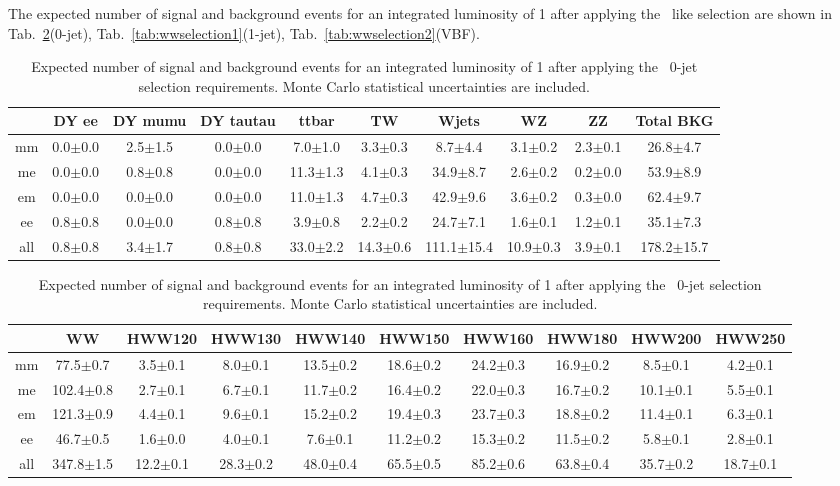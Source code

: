The expected number of signal and background events for an integrated 
luminosity of 1\ifb{} after applying the 
\WW\ like selection are shown in Tab.~\ref{tab:wwselection0}(0-jet), Tab.~\ref{tab:wwselection1}(1-jet), Tab.~\ref{tab:wwselection2}(VBF).

\begin{table}[!ht]
  \begin{center}
 {\small
  \begin{tabular} {|c|c|c|c|c|c|c|c|c|c|}
\hline
  & DY ee & DY mumu & DY tautau & ttbar & TW & Wjets & WZ & ZZ & Total BKG \\
  \hline
  \hline
  mm &  0.0$\pm$0.0 &  2.5$\pm$1.5 &  0.0$\pm$0.0 &  7.0$\pm$1.0 &  3.3$\pm$0.3 &   8.7$\pm$4.4 &  3.1$\pm$0.2 &  2.3$\pm$0.1 &  26.8$\pm$4.7 \\
  me &  0.0$\pm$0.0 &  0.8$\pm$0.8 &  0.0$\pm$0.0 & 11.3$\pm$1.3 &  4.1$\pm$0.3 &  34.9$\pm$8.7 &  2.6$\pm$0.2 &  0.2$\pm$0.0 &  53.9$\pm$8.9 \\
  em &  0.0$\pm$0.0 &  0.0$\pm$0.0 &  0.0$\pm$0.0 & 11.0$\pm$1.3 &  4.7$\pm$0.3 &  42.9$\pm$9.6 &  3.6$\pm$0.2 &  0.3$\pm$0.0 &  62.4$\pm$9.7 \\
  ee &  0.8$\pm$0.8 &  0.0$\pm$0.0 &  0.8$\pm$0.8 &  3.9$\pm$0.8 &  2.2$\pm$0.2 &  24.7$\pm$7.1 &  1.6$\pm$0.1 &  1.2$\pm$0.1 &  35.1$\pm$7.3 \\
 \hline
 all &  0.8$\pm$0.8 &  3.4$\pm$1.7 &  0.8$\pm$0.8 & 33.0$\pm$2.2 & 14.3$\pm$0.6 & 111.1$\pm$15.4& 10.9$\pm$0.3 &  3.9$\pm$0.1 & 178.2$\pm$15.7\\
 \hline
  \end{tabular}
  }
 {\small
  \begin{tabular} {|c|c|c|c|c|c|c|c|c|c|}
  \hline
  & WW  &  HWW120 &  HWW130 &  HWW140 & HWW150 &  HWW160 &  HWW180 &  HWW200 &  HWW250 \\
  \hline
  \hline
  mm &  77.5$\pm$0.7 &  3.5$\pm$0.1 &  8.0$\pm$0.1 & 13.5$\pm$0.2 & 18.6$\pm$0.2 & 24.2$\pm$0.3 & 16.9$\pm$0.2 &  8.5$\pm$0.1 &  4.2$\pm$0.1 \\
  me & 102.4$\pm$0.8 &  2.7$\pm$0.1 &  6.7$\pm$0.1 & 11.7$\pm$0.2 & 16.4$\pm$0.2 & 22.0$\pm$0.3 & 16.7$\pm$0.2 & 10.1$\pm$0.1 &  5.5$\pm$0.1 \\
  em & 121.3$\pm$0.9 &  4.4$\pm$0.1 &  9.6$\pm$0.1 & 15.2$\pm$0.2 & 19.4$\pm$0.3 & 23.7$\pm$0.3 & 18.8$\pm$0.2 & 11.4$\pm$0.1 &  6.3$\pm$0.1 \\
  ee &  46.7$\pm$0.5 &  1.6$\pm$0.0 &  4.0$\pm$0.1 &  7.6$\pm$0.1 & 11.2$\pm$0.2 & 15.3$\pm$0.2 & 11.5$\pm$0.2 &  5.8$\pm$0.1 &  2.8$\pm$0.1 \\
  \hline
 all & 347.8$\pm$1.5 & 12.2$\pm$0.1 & 28.3$\pm$0.2 & 48.0$\pm$0.4 & 65.5$\pm$0.5 & 85.2$\pm$0.6 & 63.8$\pm$0.4 & 35.7$\pm$0.2 & 18.7$\pm$0.1 \\
 \hline
  \end{tabular}
  }
  \caption{Expected number of signal and background events for an 
  integrated luminosity of 1\ifb{} after 
  applying the \ww\ 0-jet selection requirements. Monte Carlo statistical uncertainties are 
  included.}
   \label{tab:wwselection0}
  \end{center}
\end{table}

